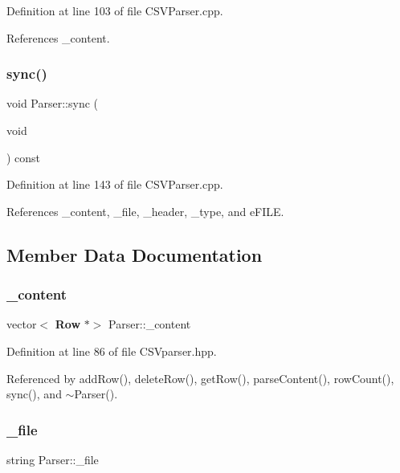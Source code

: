 Definition at line 103 of file C\+S\+V\+Parser.\+cpp.



References \+\_\+content.

\mbox{\label{class_parser_aa92421ad7f5c4bb158b0b2f389458947}} 
\subsubsection{sync()}
{\footnotesize\ttfamily void Parser\+::sync (\begin{DoxyParamCaption}\item[{void}]{ }\end{DoxyParamCaption}) const}



Definition at line 143 of file C\+S\+V\+Parser.\+cpp.



References \+\_\+content, \+\_\+file, \+\_\+header, \+\_\+type, and e\+F\+I\+LE.



\subsection{Member Data Documentation}
\mbox{\label{class_parser_a47c9a793cb0869cb19a60883eebc469d}} 
\subsubsection{\_content}
{\footnotesize\ttfamily vector$<$\textbf{ Row} $\ast$$>$ Parser\+::\+\_\+content\hspace{0.3cm}{\ttfamily [private]}}



Definition at line 86 of file C\+S\+Vparser.\+hpp.



Referenced by add\+Row(), delete\+Row(), get\+Row(), parse\+Content(), row\+Count(), sync(), and $\sim$\+Parser().

\mbox{\label{class_parser_af173d4c3df007ee81d42887b4a15060a}} 
\subsubsection{\_file}
{\footnotesize\ttfamily string Parser\+::\+\_\+file\hspace{0.3cm}{\ttfamily [private]}}




